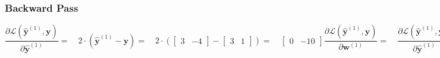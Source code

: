 \documentclass[addpoints]{exam}
\begin{document}
\subsubsection{Backward Pass}
\begin{subequations}
	\begin{equation}
		\frac{\partial\mathscr{L}(\hat{\textbf{y}}^{(1)},\textbf{y})}{\partial \hat{\textbf{y}}^{(1)}} = \quad 2 \cdot (\hat{\textbf{y}}^{(1)} - \textbf{y}) = \quad 2 \cdot (  \begin{bmatrix}
			3&-4 
		\end{bmatrix} - \begin{bmatrix}
			3&1 
		\end{bmatrix}) =\quad \begin{bmatrix}
			0&-10
		\end{bmatrix}
	\end{equation}
	\begin{equation} \label{2b}
		\frac{\partial\mathscr{L}(\hat{\textbf{y}}^{(1)},\textbf{y})}{\partial \textbf{w}^{(1)}} =\quad \frac{\partial\mathscr{L}(\hat{\textbf{y}}^{(1)},\textbf{y})}{\partial \hat{\textbf{y}}^{(1)}}\cdot \frac{\partial\hat{\textbf{y}}^{(1)}}{\partial \textbf{w}^{(1)}}
		=  \quad   2\cdot (\hat{\textbf{y}}^{(1)} - \textbf{y}) \cdot \textbf{X}= \quad \begin{bmatrix}
			\begin{bmatrix}
				0
			\end{bmatrix} & \begin{bmatrix}
				-10
			\end{bmatrix}
		\end{bmatrix} \cdot \begin{bmatrix}
			\begin{bmatrix}
				2 \\-1
				
			\end{bmatrix} \begin{bmatrix}
				-1 \\3
				
			\end{bmatrix}
		\end{bmatrix}=  \quad \begin{bmatrix}
			\begin{bmatrix}
				0 \\0
				
			\end{bmatrix}^{T} & \begin{bmatrix}
				10\\-30
				
			\end{bmatrix}^{T} \end{bmatrix}
	\end{equation}
\end{subequations}
\end{document}
